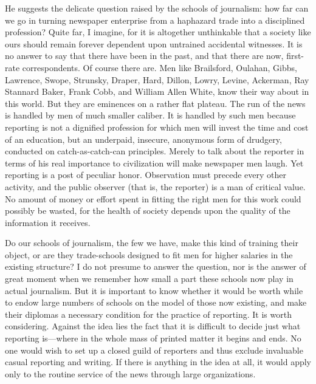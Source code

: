 \documentclass[openany,nobib,nohyper]{tufte-book}
\begin{document}
He suggests the delicate question raised by the schools of journalism:
how far can we go in turning newspaper enterprise from a haphazard trade
into a disciplined profession? Quite far, I imagine, for it is
altogether unthinkable that a society like ours should remain forever
dependent upon untrained accidental witnesses. It is no answer to say
that there have been in the past, and that there are now, first-rate
correspondents. Of course there are. Men like Brailsford, Oulahan,
Gibbs, Lawrence, Swope, Strunsky, Draper, Hard, Dillon, Lowry, Levine,
Ackerman, Ray Stannard Baker, Frank Cobb, and William Allen White, know
their way about in this world. But they are eminences on a rather flat
plateau. The run of the news is handled by men of much smaller caliber.
It is handled by such men because reporting is not a dignified
profession for which men will invest the time and cost of an education,
but an underpaid, insecure, anonymous form of drudgery, conducted on
catch-as-catch-can principles. Merely to talk about the reporter in
terms of his real importance to civilization will make newspaper men
laugh. Yet reporting is a post of peculiar honor. Observation must
precede every other activity, and the public observer (that is, the
reporter) is a man of critical value. No amount of money or effort spent
in fitting the right men for this work could possibly be wasted, for the
health of society depends upon the quality of the information it
receives.

Do our schools of journalism, the few we have, make this kind of
training their object, or are they trade-schools designed to fit men for
higher salaries in the existing structure? I do not presume to answer
the question, nor is the answer of great moment when we remember how
small a part these schools now play in actual journalism. But it is
important to know whether it would be worth while to endow large numbers
of schools on the model of those now existing, and make their diplomas a
necessary condition for the practice of reporting. It is worth
considering. Against the idea lies the fact that it is difficult to
decide just what reporting is---where in the whole mass of printed
matter it begins and ends. No one would wish to set up a closed guild of
reporters and thus exclude invaluable casual reporting and writing. If
there is anything in the idea at all, it would apply only to the routine
service of the news through large organizations.
\end{document}
